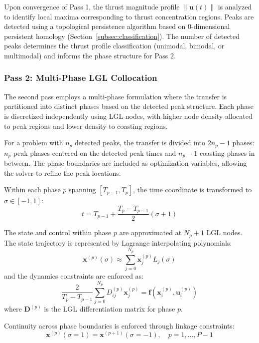 \documentclass[a4paper,fleqn]{cas-dc}
\begin{document}
Upon convergence of Pass 1, the thrust magnitude profile $\|\mathbf{u}(t)\|$ is analyzed to identify local maxima corresponding to thrust concentration regions. Peaks are detected using a topological persistence algorithm based on 0-dimensional persistent homology (Section~\ref{subsec:classification}). The number of detected peaks determines the thrust profile classification (unimodal, bimodal, or multimodal) and informs the phase structure for Pass 2.

\subsubsection{Pass 2: Multi-Phase LGL Collocation}

The second pass employs a multi-phase formulation where the transfer is partitioned into distinct phases based on the detected peak structure. Each phase is discretized independently using LGL nodes, with higher node density allocated to peak regions and lower density to coasting regions.

For a problem with $n_p$ detected peaks, the transfer is divided into $2n_p - 1$ phases: $n_p$ peak phases centered on the detected peak times and $n_p - 1$ coasting phases in between. The phase boundaries are included as optimization variables, allowing the solver to refine the peak locations.

Within each phase $p$ spanning $[T_{p-1}, T_p]$, the time coordinate is transformed to $\sigma \in [-1, 1]$:
\begin{equation}
t = T_{p-1} + \frac{T_p - T_{p-1}}{2}(\sigma + 1)
\end{equation}

The state and control within phase $p$ are approximated at $N_p + 1$ LGL nodes. The state trajectory is represented by Lagrange interpolating polynomials:
\begin{equation}
\mathbf{x}^{(p)}(\sigma) \approx \sum_{j=0}^{N_p} \mathbf{x}_j^{(p)} L_j(\sigma)
\end{equation}
and the dynamics constraints are enforced as:
\begin{equation}
\frac{2}{T_p - T_{p-1}} \sum_{j=0}^{N_p} D_{ij}^{(p)} \mathbf{x}_j^{(p)} = \mathbf{f}(\mathbf{x}_i^{(p)}, \mathbf{u}_i^{(p)})
\end{equation}
where $\mathbf{D}^{(p)}$ is the LGL differentiation matrix for phase $p$.

Continuity across phase boundaries is enforced through linkage constraints:
\begin{equation}
\mathbf{x}^{(p)}(\sigma = 1) = \mathbf{x}^{(p+1)}(\sigma = -1), \quad p = 1, \ldots, P-1
\end{equation}
\end{document}
